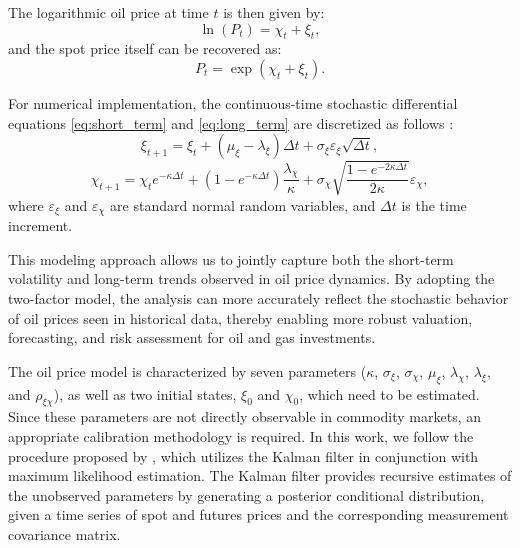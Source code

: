 \documentclass[pdflatex,sn-basic]{sn-jnl}%
\theoremstyle{thmstyleone}%
\theoremstyle{thmstyletwo}%
\theoremstyle{thmstylethree}%
\begin{document}
The logarithmic oil price at time $t$ is then given by:
\begin{equation}
    \ln (P_t) = \chi_t + \xi_t,
    \label{eq:log_price}
\end{equation}
and the spot price itself can be recovered as:
\begin{equation}
    P_t = \exp(\chi_t + \xi_t).
    \label{eq:spot_price}
\end{equation}

For numerical implementation, the continuous-time stochastic differential equations \eqref{eq:short_term} and \eqref{eq:long_term} are discretized as follows \citep{ref16, ref21}:
\begin{equation}
    \xi_{t+1} = \xi_t + (\mu_\xi - \lambda_\xi)\Delta t + \sigma_\xi \varepsilon_\xi \sqrt{\Delta t},
    \label{eq:long_term_discrete}
\end{equation}
\begin{equation}
    \chi_{t+1} = \chi_t e^{-\kappa \Delta t} + \left(1 - e^{-\kappa \Delta t}\right) \frac{\lambda_\chi}{\kappa} + \sigma_\chi \sqrt{\frac{1-e^{-2\kappa\Delta t}}{2\kappa}} \varepsilon_\chi,
    \label{eq:short_term_discrete}
\end{equation}
where $\varepsilon_\xi$ and $\varepsilon_\chi$ are standard normal random variables, and $\Delta t$ is the time increment.

This modeling approach allows us to jointly capture both the short-term volatility and long-term trends observed in oil price dynamics. By adopting the two-factor model, the analysis can more accurately reflect the stochastic behavior of oil prices seen in historical data, thereby enabling more robust valuation, forecasting, and risk assessment for oil and gas investments.

The oil price model is characterized by seven parameters ($\kappa$, $\sigma_{\xi}$, $\sigma_{\chi}$, $\mu_{\xi}$, $\lambda_{\chi}$, $\lambda_{\xi}$, and $\rho_{\xi\chi}$), as well as two initial states, $\xi_0$ and $\chi_0$, which need to be estimated. Since these parameters are not directly observable in commodity markets, an appropriate calibration methodology is required. In this work, we follow the procedure proposed by \cite{ref26}, which utilizes the Kalman filter in conjunction with maximum likelihood estimation. The Kalman filter provides recursive estimates of the unobserved parameters by generating a posterior conditional distribution, given a time series of spot and futures prices and the corresponding measurement covariance matrix.
\end{document}
